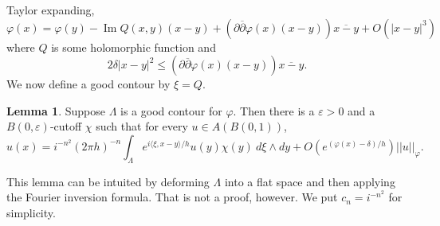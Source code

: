 \documentclass[12pt]{report}
\newcommand{\dbar}{\overline\partial}
\renewcommand{\Im}{\operatorname{Im}}
\theoremstyle{definition}
\newtheorem{lemma}[theorem]{Lemma}
\begin{document}
    Taylor expanding,
    $$\varphi(x) = \varphi(y) - \Im Q(x, y)(x - y) + (\partial\dbar\varphi(x)(x-y))\overline{x - y} + O(|x - y|^3)$$
    where $Q$ is some holomorphic function and
    $$2\delta |x - y|^2 \leq (\partial\dbar\varphi(x)(x-y))\overline{x-y}.$$
    We now define a good contour by $\xi = Q$.
\begin{lemma}
    Suppose $\Lambda$ is a good contour for $\varphi$. Then there is a $\varepsilon > 0$ and a $B(0, \varepsilon)$-cutoff $\chi$ such that for every $u \in A(B(0, 1))$,
    $$u(x) = i^{-n^2}(2\pi h)^{-n} \int_\Lambda e^{i\langle \xi, x - y\rangle/h} u(y) \chi(y) ~d\xi \wedge dy + O(e^{(\varphi(x) - \delta)/h})||u||_\varphi.$$
\end{lemma}
    This lemma can be intuited by deforming $\Lambda$ into a flat space and then applying the Fourier inversion formula. That is not a proof, however. We put $c_n = i^{-n^2}$ for simplicity.
\end{document}
